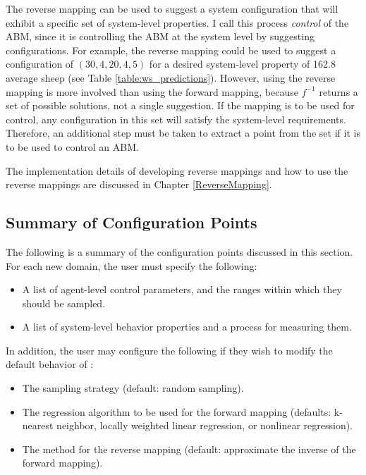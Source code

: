 The reverse mapping can be used to suggest a system configuration that will exhibit a specific set of system-level properties.
I call this process \textit{control} of the ABM, since it is controlling the ABM at the system level by suggesting configurations.
For example, the reverse mapping could be used to suggest a configuration of $(30, 4, 20, 4, 5)$  for a desired system-level property of 162.8 average sheep (see Table \ref{table:ws_predictions}).
However, using the reverse mapping is more involved than using the forward mapping, because $f^{-1}$ returns a set of possible solutions, not a single suggestion.
If the mapping is to be used for control, any configuration in this set will satisfy the system-level requirements.
Therefore, an additional step must be taken to extract a point from the set if it is to be used to control an ABM.

The implementation details of developing reverse mappings and how to use the reverse mappings are discussed in Chapter \ref{ReverseMapping}.






\subsection{Summary of Configuration Points}

The following is a summary of the configuration points discussed in this section.
For each new domain, the user must specify the following:
\begin{itemize}
   \item A list of agent-level control parameters, and the ranges within which they should be sampled.
   \item A list of system-level behavior properties and a process for measuring them.
\end{itemize}

In addition, the user may configure the following if they wish to modify the default behavior of \fw:
\begin{itemize}
   \item The sampling strategy (default: random sampling).
   \item The regression algorithm to be used for the forward mapping (defaults: k-nearest neighbor, locally weighted linear regression, or nonlinear regression).
   \item The method for the reverse mapping (default: approximate the inverse of the forward mapping).
\end{itemize}


